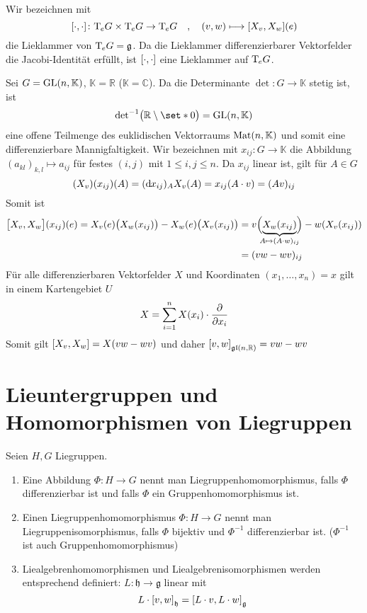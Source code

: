 \begin{definition}
	Wir bezeichnen mit 
	\[
		\benbrace*{\cdot ,\cdot } \colon \Tmap_e G \times \Tmap_e G \to \Tmap_e G \quad ,\quad  (v,w) \longmapsto \benbrace*{X_v,X_w}(e)
	\] 
	die Lieklammer von $\Tmap_e G = \mathfrak{g}$.
	Da die Lieklammer differenzierbarer Vektorfelder die Jacobi-Identität erfüllt, ist $\benbrace*{\cdot ,\cdot }$ eine Lieklammer auf $\Tmap_e G$.
\end{definition}

Sei $G=\GL(n,\mathbb{K})$, $\mathbb{K}=\mathbb{R}$ ($\mathbb{K}=\mathbb{C}$).
Da die Determinante $\det \colon G \to \mathbb{K}$ stetig ist, ist 
\[
	{\det}^{-1} \enbrace[\big]{\mathbb{R}\setminus \set*{0}} = \GL(n,\mathbb{K}) 
\]
eine offene Teilmenge des euklidischen Vektorraums $\Mat(n,\mathbb{K})$ und somit eine differenzierbare Mannigfaltigkeit.
Wir bezeichnen mit $x_{ij} \colon G \to \mathbb{K}$ die Abbildung $(a_{kl})_{k,l} \mapsto a_{ij}$ für festes $(i,j)$ mit $1\le i,j\le n$.
Da $x_{ij}$ linear ist, gilt für $A \in G$
\[
	(X_v)(x_{ij})(A) = (\mathd x_{ij})_A X_v(A) = x_{ij}(A \cdot v) = (A v)_{ij}
\]
Somit ist
\begin{align}
	\benbrace[\big]{X_v,X_w}(x_{ij})(e) = X_v(e) \enbrace[\big]{X_w(x_{ij})} - X_w(e) \enbrace[\big]{X_v(x_{ij})} &= v \enbrace[\Big]{\Underbrace{X_w(x_{ij})}{\mathclap{A \mapsto (A \cdot w)_{ij}}}} - w \enbrace*{X_v(x_{ij})} \\
	&= (v w- w v)_{ij}
\end{align}
Für alle differenzierbaren Vektorfelder $X$ und Koordinaten $(x_1, \ldots ,x_n)=x$  gilt in einem Kartengebiet $U$
\[
	X = \sum_{i=1}^{n} X(x_i) \cdot \diff{}{x_i}
\]
Somit gilt $\benbrace*{X_v,X_w} =X(vw -wv)$ und daher $\benbrace*{v,w}_{\mathfrak{gl}(n,\mathbb{R})}=vw -wv$

\section{Lieuntergruppen und Homomorphismen von Liegruppen} %
\label{sec:12}

\begin{definition}
	Seien $H,G$ Liegruppen.
	\begin{enumerate}[1)]
		\item Eine Abbildung $\Phi \colon H \to G$ nennt man Liegruppenhomomorphismus, falls $\Phi$ differenzierbar ist und falls $\Phi$ ein Gruppenhomomorphismus ist.
		\item Einen Liegruppenhomomorphismus $\Phi \colon H \to G$ nennt man Liegruppenisomorphismus, falls $\Phi$ bijektiv und $\Phi^{-1}$ differenzierbar ist. ($\Phi^{-1}$ ist auch Gruppenhomomorphismus)
		\item Liealgebrenhomomorphismen und Liealgebrenisomorphismen werden entsprechend definiert:  $L \colon \mathfrak{h} \to \mathfrak{g}$ linear mit
		\[
			L \cdot \benbrace*{v,w}_{\mathfrak{h}} = \benbrace*{L \cdot v, L \cdot w}_\mathfrak{g}
		\]
	\end{enumerate}
\end{definition}

